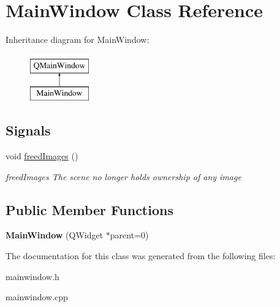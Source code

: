 \hypertarget{classMainWindow}{}\section{Main\+Window Class Reference}
\label{classMainWindow}
Inheritance diagram for Main\+Window\+:\begin{figure}[H]
\begin{center}
\leavevmode
\includegraphics[height=2.000000cm]{classMainWindow}
\end{center}
\end{figure}
\subsection*{Signals}
\begin{DoxyCompactItemize}
\item 
void \hyperlink{classMainWindow_a97826b0f39a7c296aba75f34123f3c82}{freed\+Images} ()\hypertarget{classMainWindow_a97826b0f39a7c296aba75f34123f3c82}{}\label{classMainWindow_a97826b0f39a7c296aba75f34123f3c82}

\begin{DoxyCompactList}\small\item\em freed\+Images The scene no longer holds ownership of any image \end{DoxyCompactList}\end{DoxyCompactItemize}
\subsection*{Public Member Functions}
\begin{DoxyCompactItemize}
\item 
{\bfseries Main\+Window} (Q\+Widget $\ast$parent=0)\hypertarget{classMainWindow_a8b244be8b7b7db1b08de2a2acb9409db}{}\label{classMainWindow_a8b244be8b7b7db1b08de2a2acb9409db}

\end{DoxyCompactItemize}


The documentation for this class was generated from the following files\+:\begin{DoxyCompactItemize}
\item 
mainwindow.\+h\item 
mainwindow.\+cpp\end{DoxyCompactItemize}
